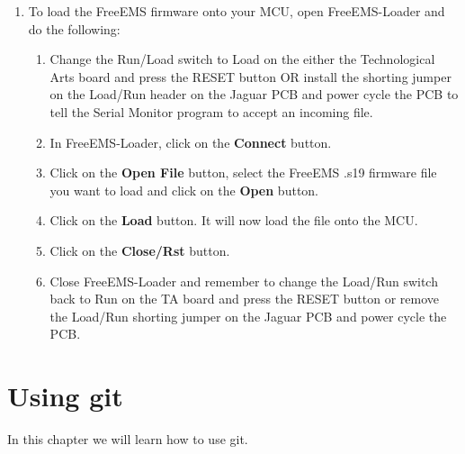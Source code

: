 \documentclass[12pt,notitlepage,onecolumn,oneside,openany]{memoir}
\begin{document}
\begin{enumerate}
\item \textsf{To load the FreeEMS firmware onto your MCU, open FreeEMS-Loader and do the following:}
      \begin{enumerate}
      \item \textsf{Change the Run/Load switch to Load on the either the Technological Arts board and press the RESET button OR install the shorting jumper on the Load/Run header on the Jaguar PCB and power cycle the PCB to tell the Serial Monitor program to accept an incoming file.} 
      \item \textsf{In FreeEMS-Loader, click on the \textbf{Connect} button.}
      \item \textsf{Click on the \textbf{Open File} button, select the FreeEMS .s19 firmware file you want to load and click on the \textbf{Open} button.}
      \item \textsf{Click on the \textbf{Load} button.  It will now load the file onto the MCU.}
      \item \textsf{Click on the \textbf{Close/Rst} button.}
      \item \textsf{Close FreeEMS-Loader and remember to change the Load/Run switch back to Run on the TA board and press the RESET button or remove the Load/Run shorting jumper on the Jaguar PCB and power cycle the PCB.}
      \end{enumerate}
\end{enumerate}

\chapter{\textsf{Using git}}

\textsf{In this chapter we will learn how to use git.} \newline
\end{document}
